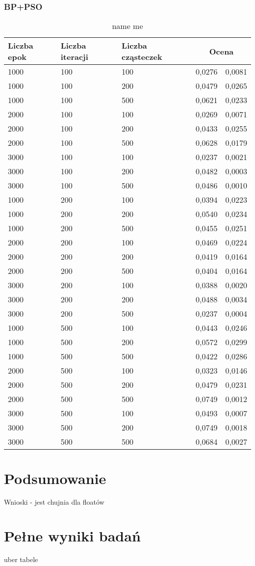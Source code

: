 \documentclass[11pt,a4paper,oneside]{report}
\begin{document}
\subsection{BP+PSO}
\begin{center}
	\begin{longtable}{|l|l|l|r@{$\pm$}r|}
		\caption{name me}\\
		\hline
		Liczba epok & Liczba iteracji & Liczba cząsteczek & \multicolumn{2}{|c|}{Ocena}\\ \hline \hline\endhead
		1000 & 100 & 100 & 0,0276 & 0,0081\\ \hline
		1000 & 100 & 200 & 0,0479 & 0,0265\\ \hline
		1000 & 100 & 500 & 0,0621 & 0,0233\\ \hline
		2000 & 100 & 100 & 0,0269 & 0,0071\\ \hline
		2000 & 100 & 200 & 0,0433 & 0,0255\\ \hline
		2000 & 100 & 500 & 0,0628 & 0,0179\\ \hline
		3000 & 100 & 100 & 0,0237 & 0,0021\\ \hline
		3000 & 100 & 200 & 0,0482 & 0,0003\\ \hline
		3000 & 100 & 500 & 0,0486 & 0,0010\\ \hline
		1000 & 200 & 100 & 0,0394 & 0,0223\\ \hline
		1000 & 200 & 200 & 0,0540 & 0,0234\\ \hline
		1000 & 200 & 500 & 0,0455 & 0,0251\\ \hline
		2000 & 200 & 100 & 0,0469 & 0,0224\\ \hline
		2000 & 200 & 200 & 0,0419 & 0,0164\\ \hline
		2000 & 200 & 500 & 0,0404 & 0,0164\\ \hline
		3000 & 200 & 100 & 0,0388 & 0,0020\\ \hline
		3000 & 200 & 200 & 0,0488 & 0,0034\\ \hline
		3000 & 200 & 500 & 0,0237 & 0,0004\\ \hline
		1000 & 500 & 100 & 0,0443 & 0,0246\\ \hline
		1000 & 500 & 200 & 0,0572 & 0,0299\\ \hline
		1000 & 500 & 500 & 0,0422 & 0,0286\\ \hline
		2000 & 500 & 100 & 0,0323 & 0,0146\\ \hline
		2000 & 500 & 200 & 0,0479 & 0,0231\\ \hline
		2000 & 500 & 500 & 0,0749 & 0,0012\\ \hline
		3000 & 500 & 100 & 0,0493 & 0,0007\\ \hline
		3000 & 500 & 200 & 0,0749 & 0,0018\\ \hline
		3000 & 500 & 500 & 0,0684 & 0,0027\\ \hline
	\end{longtable}
\end{center}

\chapter{Podsumowanie}

Wnioski - jest chujnia dla floatów





\appendix 
\chapter{Pełne wyniki badań}


uber tabele
\end{document}
